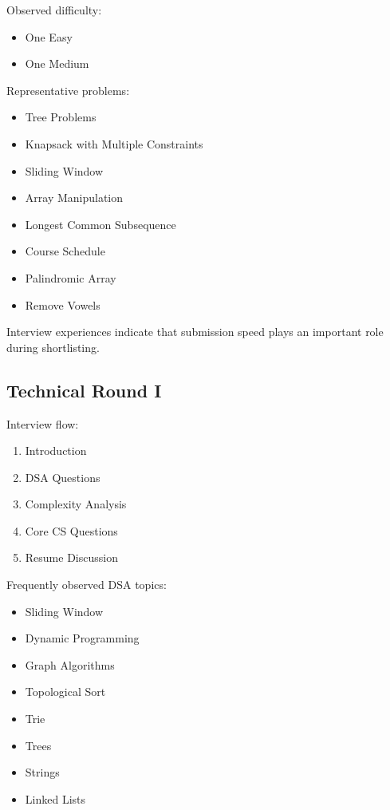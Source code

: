 \documentclass[11pt,a4paper]{article}
\begin{document}
Observed difficulty:

\begin{itemize}
	\item One Easy
	\item One Medium
\end{itemize}

Representative problems:

\begin{itemize}
	\item Tree Problems
	\item Knapsack with Multiple Constraints
	\item Sliding Window
	\item Array Manipulation
	\item Longest Common Subsequence
	\item Course Schedule
	\item Palindromic Array
	\item Remove Vowels
\end{itemize}

Interview experiences indicate that submission speed plays an important role during shortlisting.


\subsection{Technical Round I}

Interview flow:

\begin{enumerate}
	\item Introduction
	\item DSA Questions
	\item Complexity Analysis
	\item Core CS Questions
	\item Resume Discussion
\end{enumerate}

Frequently observed DSA topics:

\begin{itemize}
	\item Sliding Window
	\item Dynamic Programming
	\item Graph Algorithms
	\item Topological Sort
	\item Trie
	\item Trees
	\item Strings
	\item Linked Lists
\end{itemize}
\end{document}
